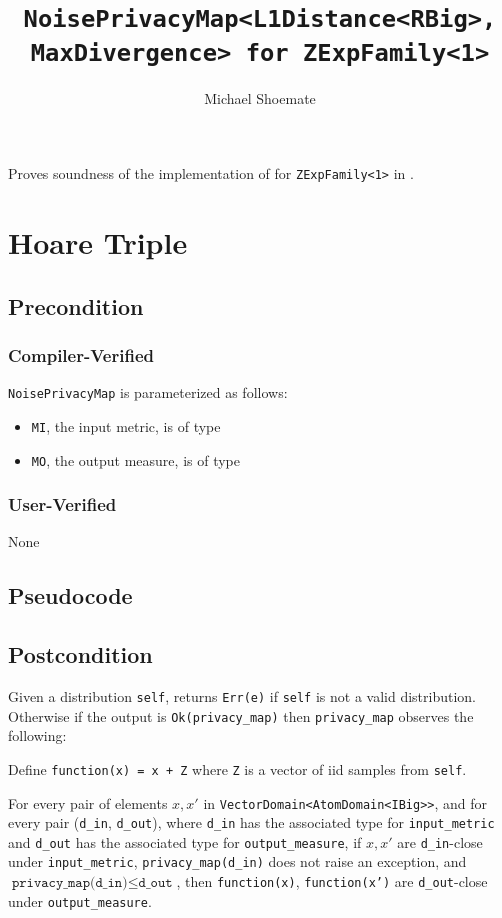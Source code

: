 \documentclass{article}
\title{\texttt{NoisePrivacyMap<L1Distance<RBig>, MaxDivergence> for ZExpFamily<1>}}
\author{Michael Shoemate}
\date{}
\begin{document}
\maketitle

\contrib
Proves soundness of the implementation of  for \texttt{ZExpFamily<1>} in .

\section{Hoare Triple}
\subsection*{Precondition}
\subsubsection*{Compiler-Verified}
\texttt{NoisePrivacyMap} is parameterized as follows:
\begin{itemize}
    \item \texttt{MI}, the input metric, is of type 
    \item \texttt{MO}, the output measure, is of type 
\end{itemize}

\subsubsection*{User-Verified}
None

\subsection*{Pseudocode}


\subsection*{Postcondition}
\begin{theorem}
    Given a distribution \texttt{self},
    returns \texttt{Err(e)} if \texttt{self} is not a valid distribution.
    Otherwise if the output is \texttt{Ok(privacy\_map)}
    then \texttt{privacy\_map} observes the following:

    Define \texttt{function(x) = x + Z} where \texttt{Z} is a vector of iid samples from \texttt{self}.

    For every pair of elements $x, x'$ in \texttt{VectorDomain<AtomDomain<IBig>{}>},
    and for every pair (\texttt{d\_in}, \texttt{d\_out}),
    where \texttt{d\_in} has the associated type for \texttt{input\_metric} and \texttt{d\_out} has the associated type for \texttt{output\_measure},
    if $x, x'$ are \texttt{d\_in}-close under \texttt{input\_metric}, \texttt{privacy\_map(d\_in)} does not raise an exception,
    and $\texttt{privacy\_map(d\_in)} \leq \texttt{d\_out}$,
    then \texttt{function(x)}, \texttt{function(x')} are \texttt{d\_out}-close under \texttt{output\_measure}.
\end{theorem}
\end{document}
